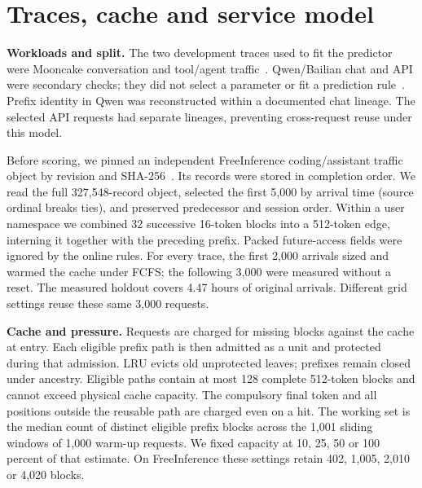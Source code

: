\documentclass[11pt,letterpaper]{article}
\begin{document}
\section{Traces, cache and service model}
\textbf{Workloads and split.} The two development traces used to fit the predictor were Mooncake conversation and tool/agent traffic~\cite{moon}. Qwen/Bailian chat and API were secondary checks; they did not select a parameter or fit a prediction rule~\cite{qwen}. Prefix identity in Qwen was reconstructed within a documented chat lineage. The selected API requests had separate lineages, preventing cross-request reuse under this model.

Before scoring, we pinned an independent FreeInference coding/assistant traffic object by revision and SHA-256~\cite{free}. Its records were stored in completion order. We read the full 327,548-record object, selected the first 5,000 by arrival time (source ordinal breaks ties), and preserved predecessor and session order. Within a user namespace we combined 32 successive 16-token blocks into a 512-token edge, interning it together with the preceding prefix. Packed future-access fields were ignored by the online rules. For every trace, the first 2,000 arrivals sized and warmed the cache under FCFS; the following 3,000 were measured without a reset. The measured holdout covers 4.47 hours of original arrivals. Different grid settings reuse these same 3,000 requests.

\textbf{Cache and pressure.} Requests are charged for missing blocks against the cache at entry. Each eligible prefix path is then admitted as a unit and protected during that admission. LRU evicts old unprotected leaves; prefixes remain closed under ancestry. Eligible paths contain at most 128 complete 512-token blocks and cannot exceed physical cache capacity. The compulsory final token and all positions outside the reusable path are charged even on a hit. The working set is the median count of distinct eligible prefix blocks across the 1,001 sliding windows of 1,000 warm-up requests. We fixed capacity at 10, 25, 50 or 100 percent of that estimate. On FreeInference these settings retain 402, 1,005, 2,010 or 4,020 blocks.
\end{document}

